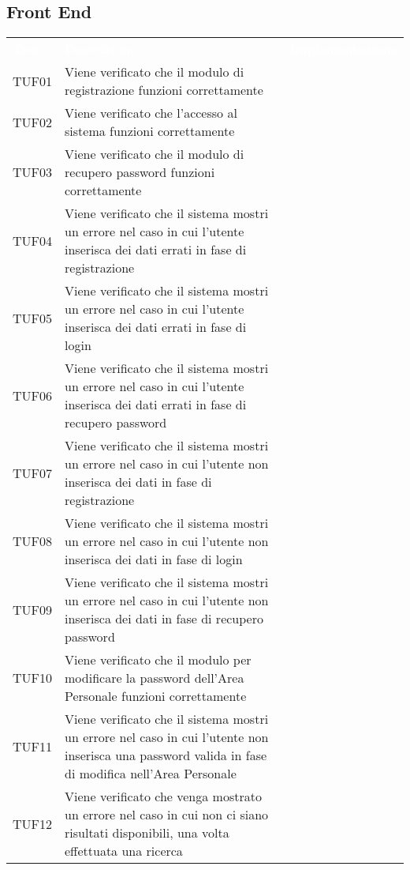 \subsection{Front End}
\renewcommand{\arraystretch}{1.5}
\begin{longtable}{ m{}<{\centering}  m{}<{\centering}  m{}<{\centering} }
	\rowcolor{darkblue}
	\textcolor{white}{\textbf{Test}} &\textcolor{white}{\textbf{Descrizione}} & \textcolor{white}{\textbf{Implementazione}} \\ 

	TUF01 & Viene verificato che il modulo di registrazione funzioni correttamente & \Su \\
	TUF02 & Viene verificato che l'accesso al sistema funzioni correttamente & \Su \\
	TUF03 & Viene verificato che il modulo di recupero password funzioni correttamente & \Su \\
	TUF04 & Viene verificato che il sistema mostri un errore nel caso in cui l'utente inserisca dei dati errati in fase di registrazione & \Su \\
	TUF05 & Viene verificato che il sistema mostri un errore nel caso in cui l'utente inserisca dei dati errati in fase di login & \Su \\
	TUF06 & Viene verificato che il sistema mostri un errore nel caso in cui l'utente inserisca dei dati errati in fase di recupero password & \Su \\
	TUF07 & Viene verificato che il sistema mostri un errore nel caso in cui l'utente non inserisca dei dati in fase di registrazione & \Su \\
	TUF08 & Viene verificato che il sistema mostri un errore nel caso in cui l'utente non inserisca dei dati in fase di login & \Su \\
	TUF09 & Viene verificato che il sistema mostri un errore nel caso in cui l'utente non inserisca dei dati in fase di recupero password & \Su \\
	TUF10 & Viene verificato che il modulo per modificare la password dell'Area Personale funzioni correttamente & \Su \\
	TUF11 & Viene verificato che il sistema mostri un errore nel caso in cui l'utente non inserisca una password valida in fase di modifica nell'Area Personale & \Su \\
	TUF12 & Viene verificato che venga mostrato un errore nel caso in cui non ci siano risultati disponibili, una volta effettuata una ricerca & \Su \\

\end{longtable}
